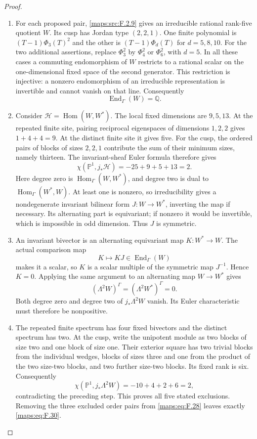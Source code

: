 \begin{proof}
\begin{enumerate}[label=\arabic*.]
\item For each proposed pair, \ref{maps:src:F.2.9} gives an
irreducible rational rank-five quotient $W$.  Its cusp has Jordan
type $(2,2,1)$.  One finite polynomial is
$(T-1)\Phi_3(T)^2$ and the other is $(T-1)\Phi_d(T)$ for
$d=5,8,10$.  For the two additional assertions, replace
$\Phi_3^2$ by $\Phi_4^2$ or $\Phi_6^2$, with $d=5$.
In all these cases a commuting endomorphism of $W$ restricts to a
rational scalar on the one-dimensional fixed space of the second
generator.  This restriction is injective: a nonzero endomorphism
of an irreducible representation is invertible and cannot vanish
on that line.  Consequently
\[
 \operatorname{End}_{\Gamma}(W)=\mathbb Q.
\]

\item Consider $\mathcal H=\operatorname{Hom}(W,W^*)$.
The local fixed dimensions are $9,5,13$.  At the repeated finite
site, pairing reciprocal eigenspaces of dimensions $1,2,2$ gives
$1+4+4=9$.  At the distinct finite site it gives five.
For the cusp, the ordered pairs of blocks of sizes $2,2,1$
contribute the sum of their minimum sizes, namely thirteen.
The invariant-sheaf Euler formula therefore gives
\[
 \chi(\mathbb P^1,j_*\mathcal H)=-25+9+5+13=2.
 \tag{F.31}\label{maps:eq:F.31}
\]
Here degree zero is $\operatorname{Hom}_{\Gamma}(W,W^*)$,
and degree two is dual to
$\operatorname{Hom}_{\Gamma}(W^*,W)$.  At least one is nonzero,
so irreducibility gives a nondegenerate invariant bilinear form
$J:W\longrightarrow W^*$, inverting the map if necessary.
Its alternating part is equivariant; if nonzero it would be
invertible, which is impossible in odd dimension.  Thus $J$ is
symmetric.

\item An invariant bivector is an alternating equivariant map
$K:W^*\longrightarrow W$.  The actual comparison map
\[
 K\longmapsto KJ\in\operatorname{End}_{\Gamma}(W)
\]
makes it a scalar, so $K$ is a scalar multiple of the symmetric
map $J^{-1}$.  Hence $K=0$.  Applying the same argument to an
alternating map $W\longrightarrow W^*$ gives
\[
 (\Lambda^2W)^\Gamma=(\Lambda^2W^*)^\Gamma=0.
\]
Both degree zero and degree two of $j_*\Lambda^2W$ vanish.
Its Euler characteristic must therefore be nonpositive.

\item The repeated finite spectrum has four fixed bivectors and
the distinct spectrum has two.  At the cusp, write the unipotent
module as two blocks of size two and one block of size one.
Their exterior square has two trivial blocks from the individual
wedges, blocks of sizes three and one from the product of the
two size-two blocks, and two further size-two blocks.  Its fixed
rank is six.  Consequently
\[
 \chi(\mathbb P^1,j_*\Lambda^2W)=-10+4+2+6=2,
\]
contradicting the preceding step.  This proves all five stated
exclusions.  Removing the three excluded order pairs from
\eqref{maps:eq:F.28} leaves exactly \eqref{maps:eq:F.30}.
\end{enumerate}
\end{proof}




